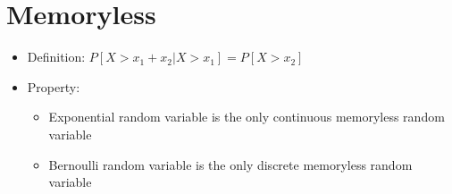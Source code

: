 \documentclass[a4paper]{article}
\begin{document}
\section{Memoryless}
\begin{itemize}
    \item Definition: $P[X > x_1 + x_2 | X > x_1] = P[X > x_2]$
    \item Property:
        \begin{itemize}
            \item Exponential random variable is the only continuous memoryless random variable
            \item Bernoulli random variable is the only discrete memoryless random variable
        \end{itemize}
\end{itemize}
\end{document}
